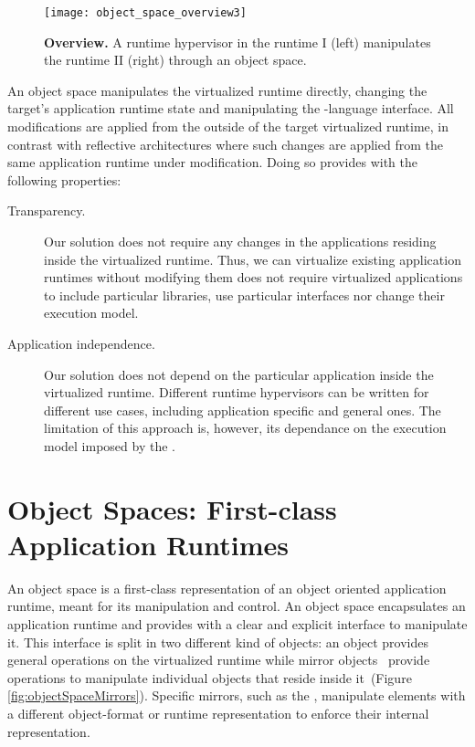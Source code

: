 \begin{figure}[htb]
\begin{center}
\texttt{[image: object\_space\_overview3]}
\caption{\textbf{\VTT Overview.} A runtime hypervisor in the runtime I (left) manipulates the runtime II (right) through an object space.\label{fig:objectSpaceOverview_architecture}}
\end{center}
\end{figure}

An object space manipulates the virtualized runtime directly, changing the target's application runtime state and manipulating the \VM-language interface. All modifications are applied from the outside of the target virtualized runtime, in contrast with reflective architectures where such changes are applied from the same application runtime under modification. Doing so provides \Vtt with the following properties:

\begin{description}
\item[Transparency.] Our solution does not require any changes in the applications residing inside the virtualized runtime. Thus, we can virtualize existing application runtimes without modifying them \ie \Vtt does not require virtualized applications to include particular libraries, use particular interfaces nor change their execution model.

\item[Application independence.] Our solution does not depend on the particular application inside the virtualized runtime. Different runtime hypervisors can be written for different use cases, including application specific and general ones. The limitation of this approach is, however, its dependance on the execution model imposed by the \VM.
\end{description}

\section{Object Spaces: First-class Application Runtimes} \label{sec:object_space}

An object space is a first-class representation of an object oriented application runtime, meant for its manipulation and control. An object space encapsulates an application runtime and provides with a clear and explicit interface to manipulate it. This interface is split in two different kind of objects: an  object provides general operations on the virtualized runtime while mirror objects~\cite{Brac04b} provide operations to manipulate individual objects that reside inside it~(Figure \ref{fig:objectSpaceMirrors}). Specific mirrors, such as the , manipulate elements with a different object-format or runtime representation to enforce their internal representation.

